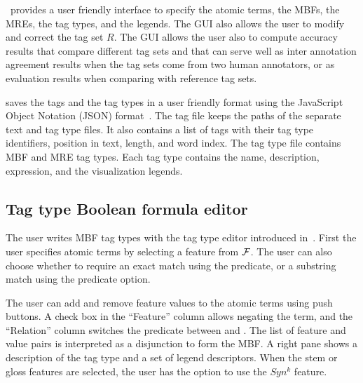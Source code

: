 \framework~provides a user friendly interface to specify the 
atomic terms, the MBFs, the MREs, 
the tag types, and the legends. 
The GUI also allows the user to modify and correct the 
tag set $R$. 
The GUI allows the user also to compute accuracy results 
that compare different tag sets and that can serve well as 
inter annotation agreement results
when the tag sets come from two human annotators, 
or as evaluation results when comparing with reference tag sets.

\framework saves the tags and the tag types in a user friendly format using
the JavaScript Object Notation (JSON) format~\cite{nolan2014javascript}.
The tag file keeps the paths of the separate text and tag type files. 
It also contains a list of tags with their tag type identifiers,
position in text, length, and word index.
The tag type file contains MBF and MRE tag types. 
Each tag type contains the name, description, expression, and the visualization legends.


\subsection{Tag type Boolean formula editor}
The user writes MBF tag types with the tag type editor introduced in~\cite{JaZaMatar}. %
First the user specifies atomic terms by selecting a feature from ${\cal F}$. 
The user can also choose whether to require an exact match using the
 predicate, or a substring match using the
 predicate option.

The user can add and remove feature values to the atomic terms 
using push buttons. 
A check box in the ``Feature'' column allows negating the term, and the
``Relation'' column switches the predicate between 
 and . 
The list of feature and value pairs is interpreted as a disjunction to form
the MBF. 
A right pane shows a description of the tag type and a set of legend 
descriptors. 
When the stem or gloss features are selected, the user has the option to 
use the $Syn^k$ feature. 

